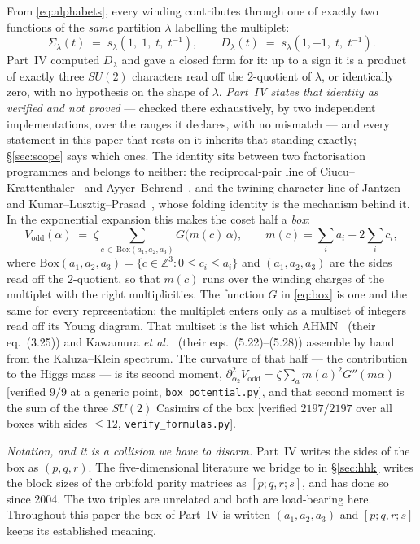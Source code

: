 \documentclass[11pt,a4paper]{article}
\newcommand{\ZZ}{\mathbb{Z}}
\newcommand{\su}[1]{SU(#1)}
\newcommand{\Sig}{\Sigma_\lambda}
\newcommand{\Dl}{D_\lambda}
\begin{document}
From \eqref{eq:alphabets}, every winding contributes through one of exactly two functions of the
\emph{same} partition $\lambda$ labelling the multiplet:
\begin{equation}\label{eq:SigD}
\Sig(t) \;=\; s_\lambda(1,\;1,\;t,\;t^{-1}),
\qquad
\Dl(t) \;=\; s_\lambda(1,-1,\;t,\;t^{-1}).
\end{equation}
Part~IV computed $\Dl$ and gave a closed form for it: up to a sign it is a product of exactly
three $\su2$ characters read off the $2$-quotient of $\lambda$, or identically zero, with no
hypothesis on the shape of $\lambda$. \emph{Part~IV states that identity as verified and not
proved} --- checked there exhaustively, by two independent implementations, over the ranges it
declares, with no mismatch --- and every statement in this paper that rests on it inherits that
standing exactly; \S\ref{sec:scope} says which ones. The identity sits between two factorisation
programmes and belongs to neither: the reciprocal-pair line of Ciucu--Krattenthaler~\cite{CK} and
Ayyer--Behrend~\cite{AB}, and the twining-character line of Jantzen~\cite{Jantzen} and
Kumar--Lusztig--Prasad~\cite{KLP}, whose folding identity is the mechanism behind it. In the
exponential expansion this makes the coset half a
\emph{box}:
\begin{equation}\label{eq:box}
V_{\mathrm{odd}}(\alpha) \;=\; \zeta \sum_{c\,\in\,\mathrm{Box}(a_1,a_2,a_3)} G\big(m(c)\,\alpha\big),
\qquad m(c)=\textstyle\sum_i a_i - 2\sum_i c_i ,
\end{equation}
where $\mathrm{Box}(a_1,a_2,a_3)=\{c\in\ZZ^3 : 0\le c_i\le a_i\}$ and $(a_1,a_2,a_3)$ are the sides
read off the $2$-quotient, so that $m(c)$ runs over the winding charges of the multiplet with the
right multiplicities. The function $G$ in \eqref{eq:box} is one and the same for every
representation: the multiplet
enters only as a
multiset of integers read off its Young diagram. That multiset is the list which
AHMN~\cite{AHMN} (their eq.~(3.25)) and Kawamura \emph{et al.}~\cite{KKKY} (their eqs.~(5.22)--(5.28))
assemble by hand from the Kaluza--Klein spectrum. The curvature of that half --- the contribution to
the Higgs mass --- is its second moment,
$\partial^2_{\alpha_2}V_{\mathrm{odd}}=\zeta\sum_a m(a)^2G''(m\alpha)$ [verified $9/9$ at a generic
point, \texttt{box\_potential.py}], and that second moment is the sum of the three $\su2$ Casimirs
of the box [verified $2197/2197$ over all boxes with sides $\le12$, \texttt{verify\_formulas.py}].

\emph{Notation, and it is a collision we have to disarm.} Part~IV writes the sides of the box as
$(p,q,r)$. The five-dimensional literature we bridge to in \S\ref{sec:hhk} writes the block sizes of
the orbifold parity matrices as $[p;q,r;s]$, and has done so since 2004. The two triples are
unrelated and both are load-bearing here. Throughout this paper the box of Part~IV is written
$(a_1,a_2,a_3)$ and $[p;q,r;s]$ keeps its established meaning.
\end{document}
